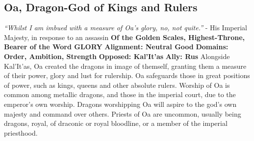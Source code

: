 \subsection{Oa, Dragon-God of Kings and Rulers}\label{god:oa}
\textit{“Whilst I am imbued with a measure of Oa’s glory, no, not quite.”}
\break
\hspace*{\fill} - His Imperial Majesty, in response to an assassin
\break
\break
\textbf{Of the Golden Scales, Highest-Throne, Bearer of the Word GLORY}\break
\hspace*{\fill}\break
\textbf{Alignment:\hspace*{\fill} Neutral Good} \break
\textbf{Domains:\hspace*{\fill} Order, Ambition, Strength} \break
\textbf{Opposed:\hspace*{\fill} Kal’It’as} \break
\textbf{Ally:\hspace*{\fill} Rus} \break
\hspace*{\fill}\break
Alongside Kal'It'as, Oa created the dragons in image of themself, granting them a measure of their power, glory and lust for rulership. Oa safeguards those in great positions of power, such as kings, queens and other absolute rulers.\newline  
Worship of Oa is common among metallic dragons, and those in the imperial court, due to the emperor’s own worship. Dragons worshipping Oa will aspire to the god’s own majesty and command over others. \newline
Priests of Oa are uncommon, usually being dragons, royal, of draconic or royal bloodline, or a member of the imperial priesthood.

